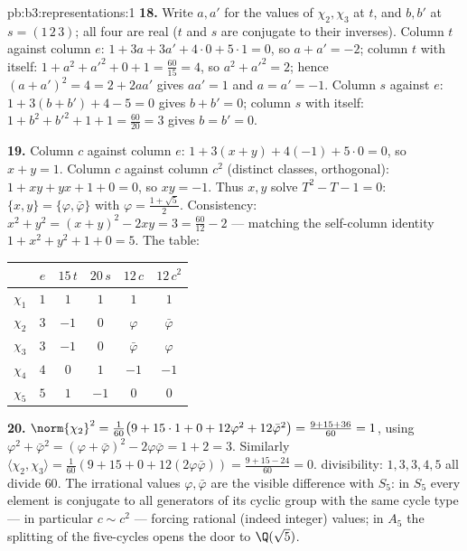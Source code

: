 \begin{solution}{pb:b3:representations:1}
\textbf{18.} Write $a, a'$ for the values of $\chi_2, \chi_3$
at $t$, and $b, b'$ at $s = (1\,2\,3)$; all four are real ($t$
and $s$ are conjugate to their inverses). Column $t$ against
column $e$: $1 + 3a + 3a' + 4\cdot0 + 5\cdot1 = 0$, so $a + a'
= -2$; column $t$ with itself: $1 + a^2 + a'^2 + 0 + 1 =
\frac{60}{15} = 4$, so $a^2 + a'^2 = 2$; hence $(a + a')^2 = 4
= 2 + 2aa'$ gives $aa' = 1$ and $a = a' = -1$. Column $s$
against $e$: $1 + 3(b + b') + 4 - 5 = 0$ gives $b + b' = 0$;
column $s$ with itself: $1 + b^2 + b'^2 + 1 + 1 = \frac{60}
{20} = 3$ gives $b = b' = 0$.

\textbf{19.} Column $c$ against column $e$: $1 + 3(x + y) +
4(-1) + 5\cdot0 = 0$, so $x + y = 1$. Column $c$ against
column $c^2$ (distinct classes, orthogonal): $1 + xy + yx + 1
+ 0 = 0$, so $xy = -1$. Thus $x, y$ solve $T^2 - T - 1 = 0$:
$\{x, y\} = \{\varphi, \bar\varphi\}$ with $\varphi = \frac{1 +
\sqrt5}2$. Consistency: $x^2 + y^2 = (x+y)^2 - 2xy = 3 =
\frac{60}{12} - 2$ --- matching the self-column identity $1 +
x^2 + y^2 + 1 + 0 = 5$. The table:
\begin{center}
\begin{tabular}{c|ccccc}
 & $e$ & $15\,t$ & $20\,s$ & $12\,c$ & $12\,c^2$\\
\hline
$\chi_1$ & $1$ & $1$ & $1$ & $1$ & $1$\\
$\chi_2$ & $3$ & $-1$ & $0$ & $\varphi$ & $\bar\varphi$\\
$\chi_3$ & $3$ & $-1$ & $0$ & $\bar\varphi$ & $\varphi$\\
$\chi_4$ & $4$ & $0$ & $1$ & $-1$ & $-1$\\
$\chi_5$ & $5$ & $1$ & $-1$ & $0$ & $0$\\
\end{tabular}
\end{center}

\textbf{20.} $\norm{\chi_2}^2 = \frac1{60}\bigl(9 + 15\cdot1 +
0 + 12\varphi^2 + 12\bar\varphi^2\bigr) = \frac{9 + 15 +
36}{60} = 1$, using $\varphi^2 + \bar\varphi^2 = (\varphi +
\bar\varphi)^2 - 2\varphi\bar\varphi = 1 + 2 = 3$. Similarly
$\langle\chi_2, \chi_3\rangle = \frac1{60}(9 + 15 + 0 +
12(2\varphi\bar\varphi)) = \frac{9 + 15 - 24}{60} = 0$.
 divisibility: $1, 3, 3, 4, 5$ all divide $60$.
The irrational values $\varphi, \bar\varphi$ are the visible
difference with $S_5$: in $S_5$ every element is conjugate to
all generators of its cyclic group with the same cycle type
--- in particular $c \sim c^2$ --- forcing rational (indeed
integer)  values; in $A_5$ the splitting of the
five-cycles opens the door to $\Q(\sqrt5)$.


\end{solution}
